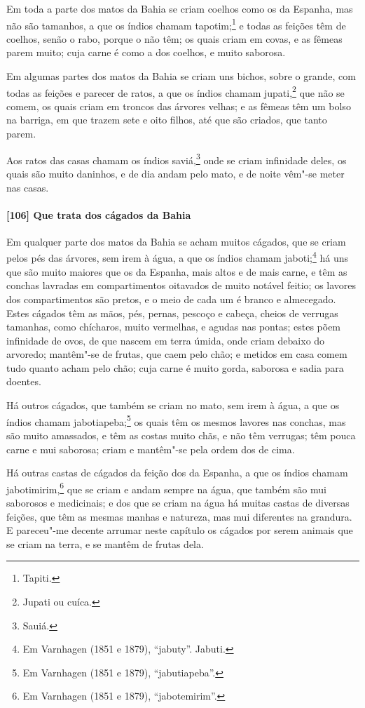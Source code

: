 Em toda a parte dos matos da Bahia se criam coelhos como os da Espanha, mas não são
tamanhos, a que os índios chamam tapotim;\footnote{ Tapiti.} e todas as feições têm de
coelhos, senão o rabo, porque o não têm; os quais criam em covas, e as fêmeas parem muito;
cuja carne é como a dos coelhos, e muito saborosa.

Em algumas partes dos matos da Bahia se criam uns bichos, sobre o grande, com todas as
feições e parecer de ratos, a que os índios chamam jupati,\footnote{ Jupati ou cuíca.} que
não se comem, os quais criam em troncos das árvores velhas; e as fêmeas têm um bolso na
barriga, em que trazem sete e oito filhos, até que são criados, que tanto parem.

Aos ratos das casas chamam os índios saviá,\footnote{ Sauiá.} onde se criam infinidade
deles, os quais são muito daninhos, e de dia andam pelo mato, e de noite vêm"-se meter nas
casas.

\paragraph{[106] Que trata dos cágados da Bahia}\quad
Em qualquer parte dos matos da Bahia se acham muitos cágados, que se criam pelos pés das
árvores, sem irem à água, a que os índios chamam jaboti;\footnote{ Em Varnhagen (1851 e
1879), ``jabuty''. Jabuti.} há uns que são muito maiores que os da Espanha, mais altos e
de mais carne, e têm as conchas lavradas em compartimentos oitavados de muito notável
feitio; os lavores dos compartimentos são pretos, e o meio de cada um é branco e
almecegado. Estes cágados têm as mãos, pés, pernas, pescoço e cabeça, cheios de verrugas
tamanhas, como chícharos, muito vermelhas, e agudas nas pontas; estes põem infinidade de
ovos, de que nascem em terra úmida, onde criam debaixo do arvoredo; mantêm"-se de frutas,
que caem pelo chão; e metidos em casa comem tudo quanto acham pelo chão; cuja carne é
muito gorda, saborosa e sadia para doentes.

Há outros cágados, que também se criam no mato, sem irem à água, a que os índios chamam
jabotiapeba;\footnote{ Em Varnhagen (1851 e 1879), ``jabutiapeba''.} os quais têm os
mesmos lavores nas conchas, mas são muito amassados, e têm as costas muito chãs, e não têm
verrugas; têm pouca carne e mui saborosa; criam e mantêm"-se pela ordem dos de cima.

Há outras castas de cágados da feição dos da Espanha, a que os índios chamam
jabotimirim,\footnote{ Em Varnhagen (1851 e 1879), ``jabotemirim''.} que se criam e andam
sempre na água, que também são mui saborosos e medicinais; e dos que se criam na água há
muitas castas de diversas feições, que têm as mesmas manhas e natureza, mas mui diferentes
na grandura. E pareceu"-me decente arrumar neste capítulo os cágados por serem animais que
se criam na terra, e se mantêm de frutas dela.

